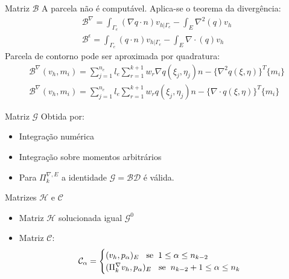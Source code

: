 \documentclass{beamer}
\begin{document}
\begin{frame}{Matriz $\mathcal{B}$}
    A parcela não é computável. Aplica-se o teorema da divergência:
    $$\begin{aligned} \mathcal{B}^\nabla = \int_{\Gamma_e} (\nabla q \cdot n) v_{h|\Gamma_e} - \int_E \nabla^2(q) v_h \\
                      \mathcal{B}^\epsilon = \int_{\Gamma_e} ( q \cdot n) v_{h|\Gamma_e} - \int_E \nabla \cdot (q) v_h   \end{aligned}$$ \pause
    Parcela de contorno pode ser aproximada por quadratura:
    $$ \begin{aligned} \mathcal{B}^\nabla(v_h,m_i) = \sum_{j=1}^{n_e} l_e\sum_{r=1}^{k+1} w_r \nabla q(\xi_j,\eta_j) n - \{\nabla^2 q(\xi,\eta)\}^T \{m_i\}  \\
                      \mathcal{B}^\nabla(v_h,m_i) = \sum_{j=1}^{n_e} l_e\sum_{r=1}^{k+1} w_r q(\xi_j,\eta_j) n - \{\nabla \cdot q(\xi,\eta)\}^T \{m_i\} \end{aligned}$$
    
\end{frame}

\begin{frame}{Matriz $\mathcal{G}$}
    Obtida por:
    \begin{itemize}
        \item Integração numérica
        \item Integração sobre momentos arbitrários
        \item Para $\Pi_k^{\nabla,E}$ a identidade $\mathcal{G}=\mathcal{B}\mathcal{D}$ é válida.
    \end{itemize}
\end{frame}

\begin{frame}{Matrizes $\mathcal{H}$ e $\mathcal{C}$}
    \begin{itemize}
        \item Matriz $\mathcal{H}$ solucionada igual $\mathcal{G}^0$
        \item Matriz $\mathcal{C}$: $$\mathcal{C}_{\alpha} = \begin{cases}
        (v_h,p_\alpha)_E \hspace{3mm} \text{se} \hspace{2mm} 1 \leq \alpha \leq n_{k-2} \\
        (\Pi_k^\nabla v_h,p_\alpha)_E \hspace{3mm} \text{se} \hspace{2mm} n_{k-2}+1 \leq \alpha \leq n_{k}
    \end{cases}$$
    \end{itemize}
\end{frame}
\end{document}
